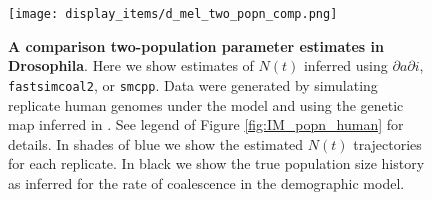 \documentclass[12pt,halfline,a4paper]{ouparticle}
\newcommand{\stopsupplement}{%
        \setcounter{table}{0}
        \renewcommand{\thetable}{\arabic{table}}%
        \setcounter{figure}{0}
        \renewcommand{\thefigure}{\arabic{figure}}%
     }
\newcommand{\dadi}{$\partial a \partial i$\xspace}
\newcommand{\smcpp}{\texttt{smcpp}\xspace}
\begin{document}
\begin{figure}
\begin{center}
\texttt{[image: display\_items/d\_mel\_two\_popn\_comp.png]}
\caption{\textbf{A comparison two-population parameter estimates in Drosophila}. Here we show estimates of $N(t)$ inferred using \dadi, \texttt{fastsimcoal2}, or \smcpp.
Data were generated by simulating
replicate human genomes under the \cite{li2006inferring} model and using the genetic map
inferred in \cite{comeron2012many}. See legend of Figure \ref{fig:IM_popn_human} for details.
In shades of blue we show the estimated
$N(t)$ trajectories for each replicate. In black we show the true population size history as inferred
for the rate of coalescence in the demographic model.}
\label{fig:two_popn_fly}
\end{center}
\end{figure}

\stopsupplement
\end{document}
